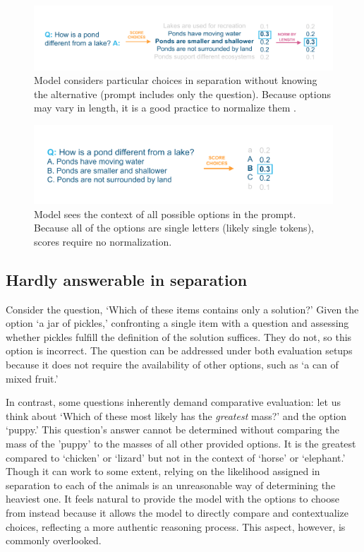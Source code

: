 \documentclass[11pt]{article}
\DeclareRobustCommand{\shl}[3]{
  \begingroup\setlength{\fboxsep}{2pt}%
  \colorbox{#1}{{\hspace*{2pt}\vphantom{Ay}#2\hspace*{2pt}}}%
  \endgroup
}
\begin{document}
\begin{figure}
    \centering
    \includegraphics[width=0.85\linewidth]{images/arc.pdf}
    \caption{Model considers particular choices in \shl{separation}{separation}{} without knowing the alternative (prompt includes only the question). Because options may vary in length, it is a good practice to normalize them \cite{norm}.}\label{fig:arc}
\end{figure}

\begin{figure}
    \centering
    \includegraphics[width=0.6\linewidth]{images/mmlu-2.pdf}
    \caption{Model sees the context of all possible \shl{all}{options}{} in the prompt. Because all of the options are single letters (likely single tokens), scores require no normalization.}\label{fig:mmlu}
\end{figure}

\subsection{Hardly answerable in separation}\label{sec:hardly}

Consider the question, `Which of these items contains only a solution?' Given the option `a jar of pickles,' confronting a single item with a question and assessing whether pickles fulfill the definition of the solution suffices. They do not, so this option is incorrect. The question can be addressed under both evaluation setups because it does not require the availability of other options, such as `a can of mixed fruit.'

In contrast, some questions inherently demand comparative evaluation: let us think about `Which of these most likely has the \textit{greatest} mass?' and the option `puppy.' 
This question’s answer cannot be determined without comparing the mass of the 'puppy' to the masses of all other provided options. It is the greatest compared to `chicken' or `lizard' but not in the context of `horse' or `elephant.' Though it can work to some extent, relying on the likelihood assigned in \shl{separation}{separation}{} to each of the animals is an unreasonable way of determining the heaviest one. It feels natural to provide the model with the \shl{all}{options}{} to choose from instead because it allows the model to directly compare and contextualize choices, reflecting a more authentic reasoning process. This aspect, however, is commonly overlooked.
\end{document}
